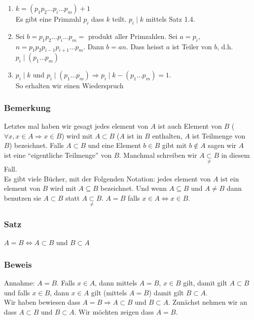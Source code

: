\begin{enumerate}
\item $k=\left( p_1 p_2\dots p_i \dots p_m \right)+1$\\
Es gibt eine Primzahl $p_i$ dass $k$ teilt. $p_i\mid k$ mittels Satz 1.4.
\item Sei $b=p_1 p_2\dots p_i \dots p_m=$ produkt aller Primzahlen. Sei $a=p_i$, $n=p_1 p_2 p_{i-1} p_{i+1} \dots p_m$. Dann $b=an$. Dass heisst $a$ ist Teiler von $b$, d.h. $p_i\mid\left(p_1\dots p_m\right)$
\item $p_i\mid k$ und $p_i\mid \left(p_1\dots p_m\right) \Rightarrow p_i \mid k-\left(p_1\dots p_m\right)=1$.\\
So erhalten wir einen Wiederspruch
\end{enumerate}

\subsubsection*{Bemerkung}
Letztes mal haben wir gesagt jedes element von $A$ ist auch Element von $B$ ($\forall x,x\in A\Rightarrow x\in B$) wird mit $A\subset B$ ($A$ ist in $B$ enthalten, $A$ ist Teilmenge von $B$) bezeichnet. Falls $A\subset B$ und eine Element $b\in B$ gibt mit $b\not\in A$ sagen wir $A$ ist eine ``eigentliche Teilmenge'' von $B$. Manchmal schreiben wir $A\mathop  \subset \limits_{\not  = } B$ in diesem Fall. \\

Es gibt viele Bücher, mit der Folgenden Notation: jedes element von $A$ ist ein element von $B$ wird mit $A\subseteq B$ bezeichnet. Und wenn $A\subseteq B$ und $A\not =B$ dann benutzen sie $A\subset B$ statt $A\mathop  \subset \limits_{\not  = } B$. $A=B$ falls $x\in A\Leftrightarrow x\in B$. 

\subsubsection*{Satz}
$A=B \Leftrightarrow A\subset B$ und $B\subset A$ 
\subsubsection*{Beweis}
Annahme: $A=B$. Falls $x\in A$, dann mittels $A=B$, $x\in B$ gilt, damit gilt $A\subset B$ und falls $x\in B$, dann $x\in A$ gilt (mittels $A=B$) damit gilt $B\subset A$.\\

Wir haben bewiesen dass $A=B \Rightarrow A\subset B \text{ und } B\subset A$. Zunächst nehmen wir an dass $A\subset B$ und $B\subset A$. Wir möchten zeigen dass $A=B$. \\

